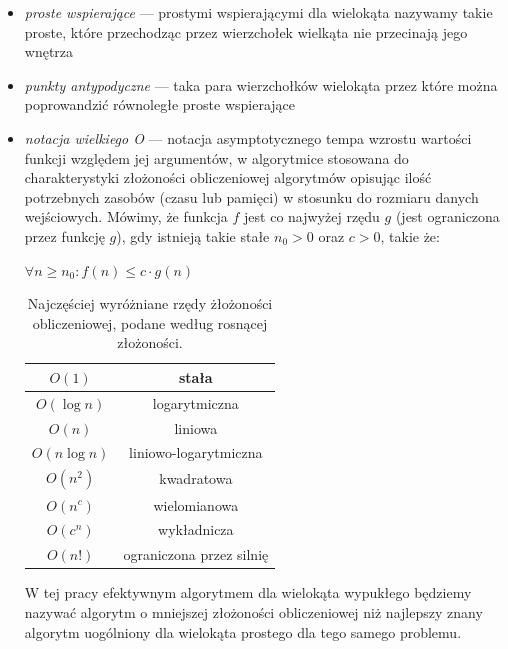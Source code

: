 \begin{itemize}
\item{\emph{proste wspierające}} --- prostymi wspierającymi dla wielokąta
  nazywamy takie proste, które przechodząc przez wierzchołek wielkąta
  nie przecinają jego wnętrza

\item{\emph{punkty antypodyczne}} --- taka para wierzchołków wielokąta przez
  które można poprowandzić równoległe proste wspierające

\item{\emph{notacja wielkiego O}} --- notacja asymptotycznego tempa
  wzrostu wartości funkcji względem jej argumentów, w algorytmice
  stosowana do charakterystyki złożoności obliczeniowej algorytmów
  opisując ilość potrzebnych zasobów (czasu lub pamięci) w stosunku do
  rozmiaru danych wejściowych. Mówimy, że funkcja $f$ jest co najwyżej
  rzędu $g$ (jest ograniczona przez funkcję $g$), gdy istnieją takie
  stałe $n_0 > 0$ oraz $c > 0$, takie że:

  \begin{center}
    $\forall n \geq n_0 : f(n) \leq c \cdot g(n)$
  \end{center}

  \begin{table}[htp]
    \centering
    \caption{Najczęściej wyróżniane rzędy żłożoności obliczeniowej,
      podane według rosnącej złożoności.}
    \begin{tabular}{c c}
      $O(1)$ & stała \\
      \hline
      $O(\log n)$ & logarytmiczna \\
      \hline
      $O(n)$ & liniowa \\
      \hline
      $O(n \log n)$ & liniowo-logarytmiczna \\
      \hline
      $O(n^2)$ & kwadratowa \\
      \hline
      $O(n^c)$ & wielomianowa \\
      \hline
      $O(c^n)$ & wykładnicza \\
      \hline
      $O(n!)$ & ograniczona przez silnię \\
    \end{tabular}
  \end{table}

  W tej pracy efektywnym algorytmem dla wielokąta wypukłego będziemy
  nazywać algorytm o mniejszej złożoności obliczeniowej niż najlepszy
  znany algorytm uogólniony dla wielokąta prostego dla tego samego
  problemu.
\end{itemize}

